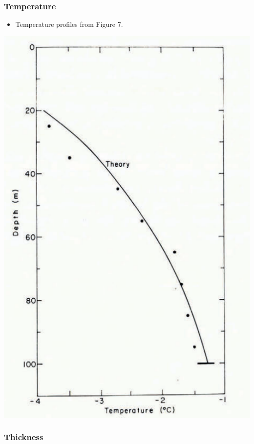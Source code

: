 \documentclass[article,a4paper,times,11pt,twoside]{article}
\begin{document}
\subsubsection{Temperature}
\label{sec:orga19d7ec}

\begin{itemize}
\item Temperature profiles from \textcite{colbeck_1979} Figure 7.
\end{itemize}

\begin{center}
\includegraphics[width=.9\linewidth]{isua_12/isua_12.png}
\end{center}

\subsubsection{Thickness}
\label{sec:org421a928}
\end{document}
